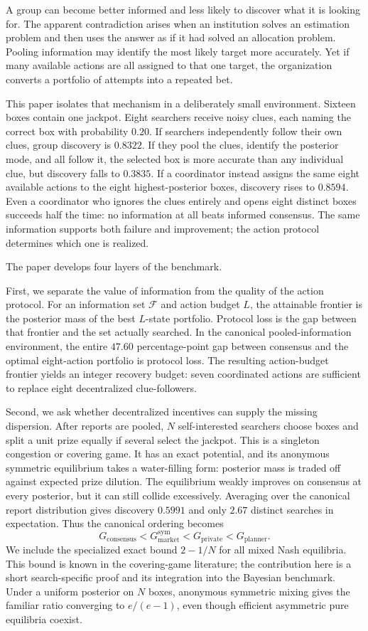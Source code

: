 \documentclass[11pt]{article}
\theoremstyle{definition}
\theoremstyle{remark}
\newcommand{\1}{\mathbf{1}}
\newcommand{\F}{\mathcal{F}}
\newcommand{\priv}{\mathrm{private}}
\newcommand{\cons}{\mathrm{consensus}}
\newcommand{\mkt}{\mathrm{market}}
\newcommand{\plan}{\mathrm{planner}}
\begin{document}
A group can become better informed and less likely to discover what it is looking for. The apparent contradiction arises when an institution solves an estimation problem and then uses the answer as if it had solved an allocation problem. Pooling information may identify the most likely target more accurately. Yet if many available actions are all assigned to that one target, the organization converts a portfolio of attempts into a repeated bet.

This paper isolates that mechanism in a deliberately small environment. Sixteen boxes contain one jackpot. Eight searchers receive noisy clues, each naming the correct box with probability $0.20$. If searchers independently follow their own clues, group discovery is $0.8322$. If they pool the clues, identify the posterior mode, and all follow it, the selected box is more accurate than any individual clue, but discovery falls to $0.3835$. If a coordinator instead assigns the same eight available actions to the eight highest-posterior boxes, discovery rises to $0.8594$. Even a coordinator who ignores the clues entirely and opens eight distinct boxes succeeds half the time: no information at all beats informed consensus. The same information supports both failure and improvement; the action protocol determines which one is realized.


The paper develops four layers of the benchmark.

First, we separate the value of information from the quality of the action protocol. For an information set $\F$ and action budget $L$, the attainable frontier is the posterior mass of the best $L$-state portfolio. Protocol loss is the gap between that frontier and the set actually searched. In the canonical pooled-information environment, the entire $47.60$ percentage-point gap between consensus and the optimal eight-action portfolio is protocol loss. The resulting action-budget frontier yields an integer recovery budget: seven coordinated actions are sufficient to replace eight decentralized clue-followers.

Second, we ask whether decentralized incentives can supply the missing dispersion. After reports are pooled, $N$ self-interested searchers choose boxes and split a unit prize equally if several select the jackpot. This is a singleton congestion or covering game. It has an exact potential, and its anonymous symmetric equilibrium takes a water-filling form: posterior mass is traded off against expected prize dilution. The equilibrium weakly improves on consensus at every posterior, but it can still collide excessively. Averaging over the canonical report distribution gives discovery $0.5991$ and only $2.67$ distinct searches in expectation. Thus the canonical ordering becomes
\[
G_{\cons}<G_{\mkt}^{\mathrm{sym}}<G_{\priv}<G_{\plan}.
\]
We include the specialized exact bound $2-1/N$ for all mixed Nash equilibria. This bound is known in the covering-game literature; the contribution here is a short search-specific proof and its integration into the Bayesian benchmark. Under a uniform posterior on $N$ boxes, anonymous symmetric mixing gives the familiar ratio converging to $e/(e-1)$, even though efficient asymmetric pure equilibria coexist.
\end{document}
